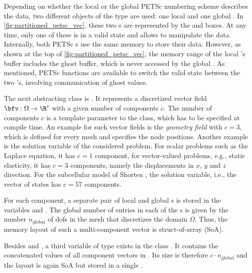 Depending on whether the local or the global PETSc numbering scheme describes the data, two different objects of the \Vec{} type are used: one local and one global \Vec{}. In \cref{fig:partitioned_petsc_vec}, these two \Vec{}s are represented by the  and  boxes. At any time, only one of these is in a valid state and allows to manipulate the data. Internally, both PETSc \Vec{}s use the same memory to store their data. However, as shown at the top of \cref{fig:partitioned_petsc_vec}, the memory range of the local \Vec{}'s buffer includes the ghost buffer, which is never accessed by the global \Vec{}. As mentioned, PETSc functions are available to switch the valid state between the two \Vec{}'s, involving communication of ghost values. 

The next abstracting class is . It represents a discretized vector field $\bfv : \Omega \to \R^c$ with a given number of components $c$. The number of components $c$ is a template parameter to the class, which has to be specified at compile time. 
An example for such vector fields is the \emph{geometry field} with $c=3$, which is defined for every mesh and specifies the node positions. Another example is the solution variable of the considered problem. For scalar problems such as the Laplace equation, it has $c=1$ component, for vector-valued problems, e.g., static elasticity, it has $c=3$ components, namely the displacements in $x$, $y$ and $z$ direction. For the subcellular model of Shorten \cite{Shorten2007}, the solution variable, i.e., the vector of states has $c=57$ components.

For each component, a separate pair of local and global \Vec{}s is stored in the variables  and . The global number of entries in each of the \Vec{}s is given by the number $n_\text{global}$ of dofs in the mesh that discretizes the domain $\Omega$. Thus, the memory layout of such a multi-component vector is struct-of-array (SoA). 

Besides  and , a third variable  of type \Vec{} exists in the class . It contains the concatenated values of all component vectors in . Its size is therefore $c\cdot n_\text{global}$ and the layout is again SoA but stored in a single \Vec{}.

